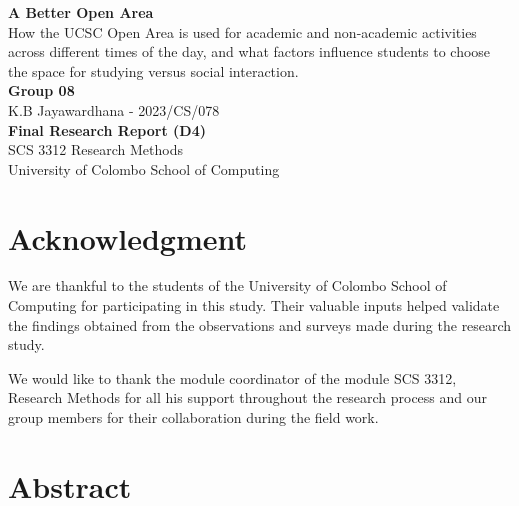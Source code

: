 \documentclass[12pt, a4paper]{report}
\begin{document}

\begin{titlepage}
    \centering
    \vspace*{2cm}
    \Huge\textbf{A Better Open Area}\\
    \vspace{0.5cm}
    \Large How the UCSC Open Area is used for academic and
non-academic activities across different times of the day,
and what factors influence students to choose the space
for studying versus social interaction.\\
    \vspace{6.5cm}
    \textbf{Group 08}\\
    K.B Jayawardhana - 2023/CS/078\\
    \vspace{2cm}
    \Large \textbf{Final Research Report (D4)}\\
    \vspace{2cm}
    SCS 3312 Research Methods\\
    \vspace{0.25cm}
    \small University of Colombo School of Computing\\
    \vfill
\end{titlepage}
\chapter*{Acknowledgment}
We are thankful to the students of the University of Colombo School of Computing for participating in this study. Their valuable inputs helped validate 
the findings obtained from the observations and surveys made during the research study.

We would like to thank the module coordinator of the module SCS 3312, Research Methods for all his support throughout the research process and our group members for their collaboration during the field work.


\chapter*{Abstract}
\end{document}
